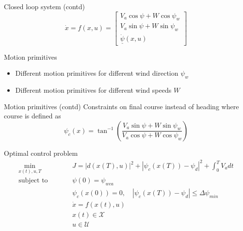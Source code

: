 \documentclass{beamer}
\begin{document}
\begin{frame}{Closed loop system (contd)}
    \begin{equation}\label{eq:closed_loop}
        \dot{x}=f(x,u)=
        \begin{bmatrix}
            V_a\cos\psi + W\cos\psi_w\\
            V_a\sin\psi + W\sin\psi_w\\
            \underline{\dot{\psi}}(x, u)
        \end{bmatrix}
    \end{equation}
\end{frame}

\begin{frame}{Motion primitives}
    \begin{itemize}
        \item Different motion primitives for different wind direction $\psi_w$
        \item Different motion primitives for different wind speeds $W$
    \end{itemize}
\end{frame}

\begin{frame}{Motion primitives (contd)}
    Constraints on final course instead of heading where course is defined as 
    \begin{equation}
        \psi_c(x) = \tan^{-1}\left(\frac{V_a\sin\psi + W\sin\psi_w}{V_a\cos\psi+W\cos\psi_w}\right)
    \end{equation}
\end{frame}

\begin{frame}{Optimal control problem}
    \begin{subequations}
        \label{eq:opt_problem_mp_uav}
        \begin{alignat}{3}
        &\min_{x(t),u,T}        &\qquad& J=|d(x(T), u)|^2 + |\psi_c(x(T))-\psi_d|^2 + \int_{0}^{T}V_a dt & \\
        &\text{subject to} & & \psi(0)=\psi_{wca} &\\
        & & & \psi_c(x(0))=0, \quad |\psi_c(x(T))-\psi_d| \leq \Delta\psi_{min} &\\
        & & & \dot{x}=f(x(t), u) &\\
        & & & x(t)\in\mathcal{X}& \\
        & & & u\in\mathcal{U} &
        \end{alignat}
    \end{subequations}
\end{frame}
\end{document}
